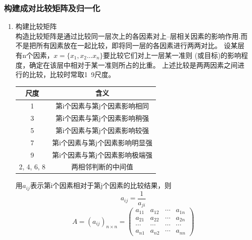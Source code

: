 \documentclass[a4paper, 12pt]{article}
\numberwithin{equation}{section}
\begin{document}
            \subsubsection{构建成对比较矩阵及归一化}
                \begin{enumerate}[(1)]
                    \item 构建比较矩阵 \\
                        \qquad 构造比较矩阵是通过比较同一层次上的各因素对上–层相关因素的影响作用.而不是把所有因素放在一起比较，即将同一层的各因素进行两两对比。
                        设某层有n个因素，$ x = \{x_{1}, x_{2} \dots x_{n}\} $要比较它们对上一层某一准则 (或目标)的影响程度，确定在该层中相对于某一准则所占的比重。
                        上述比较是两两因素之间进行的比较，比较时常取1~9尺度。

                        \begin{table}[h]
                            \centering
                            \begin{tabular}{|c|c|} \hline
                                尺度 & 含义 \\ \hline
                                1 & 第i个因素与第j个因素影响相同 \\ \hline
                                3 & 第i个因素与第j个因素影响稍强 \\ \hline
                                5 & 第i个因素与第j个因素影响较强 \\ \hline
                                7 & 第i个因素与第j个因素影响明显强 \\ \hline
                                9 & 第i个因素与第j个因素影响极端强 \\ \hline
                                2, 4, 6, 8 & 两相邻判断的中间值 \\ \hline
                            \end{tabular}
                        \end{table}

                        用$ a_{ij} $表示第i个因素相对于第j个因素的比较结果，则
                        \[ a_{ij} = \frac{1}{a_{ji}} \]
                        \begin{equation}
                            A = (a_{ij})_{n \times n} =
                            \begin{pmatrix}
                                a_{11} & a_{12} & \cdots & a_{1n} \\
                                a_{21} & a_{22} & \cdots & a_{2n} \\
                                \cdots & \cdots & \cdots & \cdots \\
                                a_{n1} & a_{n2} & \cdots & a_{nn}
                            \end{pmatrix}
                        \end{equation}


\end{enumerate}
\end{document}
